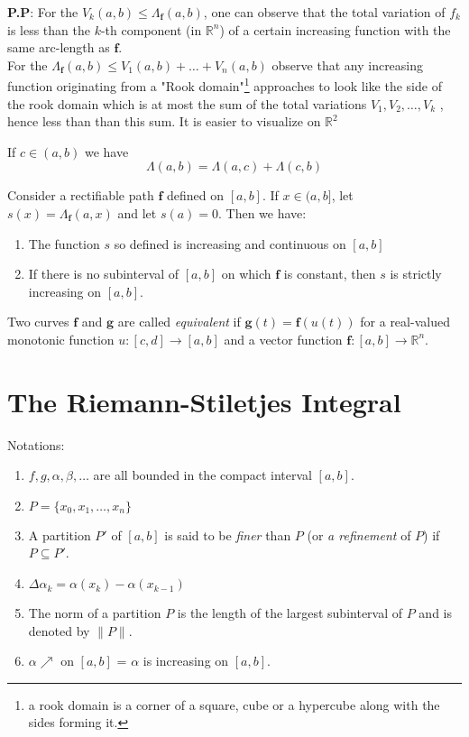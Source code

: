 \documentclass[10pt,a4paper]{book}
\begin{document}
\noindent \textbf{P.P}: For the $V_k(a,b) \leq  \Lambda_{\mathbf{f}}(a,b)$, one can observe that the total variation of $f_k$ is less than the $k$-th component (in $\mathbb{R}^n$) of a certain increasing function with the same arc-length as $\mathbf{f}$. \\
For the $\Lambda_{\mathbf{f}}(a,b) \leq V_1(a,b) + \dots + V_n(a,b)$ observe that any increasing function  originating from a "Rook domain"\footnote{a rook domain is a corner of a square, cube or a hypercube along with the sides forming it.} approaches to look like the side of the rook domain which is at most the sum of the total variations $V_1, V_2, \dots, V_k$ , hence less than  than this sum. It is easier to visualize on $\mathbb{R}^2$
 
 \begin{Thm}
If $c \in (a, b)$ we have
$$\Lambda(a,b) = \Lambda(a,c) + \Lambda(c,b)$$
 \end{Thm}
 \begin{Thm}
  Consider a rectifiable path $\mathbf{f}$ defined on $[a, b]$. If $x \in (a, b]$, let
$s(x) = \Lambda_{\mathbf{f}}(a, x)$ and let $s(a) = 0$. Then we have:
   \begin{enumerate}
       \item The function $s$ so defined is increasing and continuous on $[a, b]$
       \item If there is no subinterval of $[a, b]$ on which $\mathbf{f}$ is constant, then $s$ is strictly increasing on $[a, b]$.
   \end{enumerate}
 \end{Thm}
 
 Two curves $\mathbf{f}$ and $\mathbf{g}$ are called \textit{equivalent} if $\mathbf{g}(t) = \mathbf{f}(u(t))$ for a real-valued monotonic function $u: [c,d] \rightarrow [a,b]$ and a vector function $\mathbf{f}: [a,b] \rightarrow \mathbb{R}^n$.
 
 \chapter{The Riemann-Stiletjes Integral}
 \noindent Notations: \begin{enumerate}
\item $f,g,\alpha, \beta,\dots$ are all bounded in the compact interval $[a,b]$.
\item $P = \{x_0, x_1, \dots, x_n\}$
\item A partition $P'$ of $[a, b]$ is said to be \textit{finer} than $P$ (or \textit{a refinement} of $P$) if $P \subseteq P'$.
\item $\Delta \alpha_k = \alpha(x_k) - \alpha(x_{k-1})$
\item The norm of a partition $P$ is the length of the largest subinterval of $P$ and is denoted by $\lVert P \rVert$.
\item $\alpha \nearrow$ on $[a,b]$ = $\alpha$ is increasing on $[a,b]$.
\end{enumerate}
\end{document}
